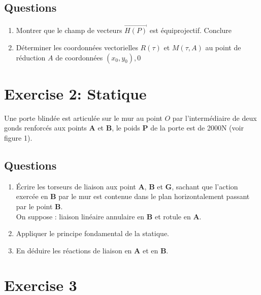 \documentclass[
]{book}
\begin{document}
\hypertarget{questions}{%
\subsection*{Questions}\label{questions}}

\begin{enumerate}
\def\labelenumi{\arabic{enumi}.}
\item
  Montrer que le champ de vecteurs \(\vec{H(P)}\) est équiprojectif. Conclure
\item
  Déterminer les coordonnées vectorielles \(R(\tau)\) et \(M(\tau, A)\) au point de réduction \(A\) de coordonnées \((x_{0}, y_{0}), 0\)
\end{enumerate}

\hypertarget{exercise-2-statique}{%
\section{Exercise 2: Statique}\label{exercise-2-statique}}

Une porte blindée est articulée sur le mur au point \(O\) par l'intermédiaire de deux gonds renforcés aux points \textbf{A} et \textbf{B}, le poids \textbf{P} de la porte est de 2000N (voir figure 1).

\hypertarget{questions-1}{%
\subsection*{Questions}\label{questions-1}}

\begin{enumerate}
\def\labelenumi{\arabic{enumi}.}
\item
  Écrire les torseurs de liaison aux point \textbf{A}, \textbf{B} et \textbf{G}, sachant que l'action exercée en \textbf{B} par le mur est contenue dans le plan horizontalement passant par le point \textbf{B}.\\
  On suppose : liaison linéaire annulaire en \textbf{B} et rotule en \textbf{A}.
\item
  Appliquer le principe fondamental de la statique.
\item
  En déduire les réactions de liaison en \textbf{A} et en \textbf{B}.
\end{enumerate}

\hypertarget{exercise-3}{%
\section{Exercise 3}\label{exercise-3}}
\end{document}

